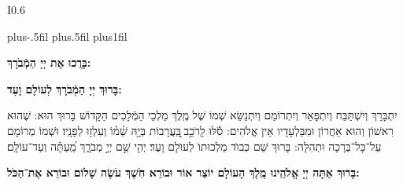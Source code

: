 \documentclass[twoside, openany, parskip=half, 11pt]{book}
\begin{document}
\newcommand{\barachu}{
\begin{wrapfigure}[5]{I}{0.6\textwidth}
\begin{minipage}{0.6\textwidth}
\leftskip=0pt plus-.5fil
\rightskip=0pt plus.5fil
\parfillskip=0pt plus1fil
\begin{large}

\shatz
\textbf{בָּרֲכוּ אֶת יְיָ הַמְֿבֹרָךְ:}
\end{large}

\vspace{12pt}

\shatzvkahal
\textbf{בָּרוּךְ יְיָ הַמְֿבֹרָךְ לְעוֹלָם וָעֶד:}
\end{minipage}
\end{wrapfigure}

\begin{footnotesize}
יִתְבָּרַךְ וְיִשְׁתַּבַּח וְיִתְפָּאַר וְיִתְרוֹמַם וְיִתְנַשֵּׂא שְׁמוֹ שֶׁל מֶֽלֶךְ מַלְכֵי הַמְּֿלָכִים הַקָּדוֹשׁ בָּרוּךְ הוּא: שֶׁהוּא רִאשׁוֹן וְהוּא אַחֲרוֹן וּמִבַּלְעָדָיו אֵין אֱלֹהִים: 
\source{תהלים סח} 
סֹ֡לּוּ לָֽרֹכֵ֣ב ֖בָּֽעֲרָבוֹת בְּיָ֥הּ שְׁ֜מ֗וֹ וְעִלְז֥וּ לְפָנָֽיו׃ וּשְׁמוֹ מְרוֹמָם עַל־כָּל־בְּרָכָה וּתְהִלָּה: בָּרוּךְ שֵׁם כְּבוֺד מַלְכוּתוֺ לְעוֺלָם וָעֶד׃ יְהִ֤י 
\source{תהלים קיג}
שֵׁ֣ם יְיָ֣ מְבֹרָ֑ךְ מֵֽ֝עַתָּ֗ה וְעַד־עוֹלָֽם׃

\end{footnotesize}
}


\barachu

\textbf{
בָּרוּךְ אַתָּה יְיָ אֱלֹהֵֽינוּ מֶֽלֶךְ הָעוֹלָם יוֹצֵר אוֹר וּבוֹרֵא חֹֽשֶׁךְ עֹשֶׂה שָׁלוֹם וּבוֹרֵא אֶת־הַכֹּל:
}

\newcommand{\hameir}{
\firstword{הַמֵּאִיר}
 לָאָֽרֶץ וְלַדָּרִים עָלֶֽיהָ בְּרַחֲמִים וּבְטוּבוֹ מְחַדֵּשׁ בְּכָל־יוֹם תָּמִיד מַעֲשֵׂה בְרֵאשִׁית:
\source{תהלים קד}
 מָֽה־רַבּ֬וּ מַֽעֲשֶׂ֨יךָ יְיָ֗ ֖כֻּלָּם בְּחָכְמָ֣ה עָשִׂ֑יתָ מָֽלְֿאָ֥ה הָ֝אָ֗רֶץ קִנְיָנֶֽךָ׃ הַמֶּֽלֶךְ הַמְֿרוֹמָם לְבַדּוֹ מֵאָז הַמְֿשֻׁבָּח וְהַמְֿפֹאָר וְהַמִּתְנַשֵּׂא מִימוֹת עוֹלָם: אֱלֹהֵי עוֹלָם בְּרַחֲמֶיךָ הָרַבִּים רַחֵם עָלֵינוּ אֲדוֹן עֻזֵּֽנוּ צוּר מִשְׂגַּבֵּנוּ מָגֵן יִשְׁעֵֽנוּ מִשְׂגָּב בַּעֲדֵֽנוּ: אֵ֗ל בָּ֗רוּךְ גְּ֗דוֹל דֵּ֗עָה הֵ֗כִין וּ֗פָעַל זָ֗הֳרֵי חַ֗מָּה ט֗וֹב יָ֗צַר כָּ֗בוֹד לִ֗שְׁמוֹ מְ֗אוֹרוֹת נָ֗תַן סְ֗בִיבוֹת עֻ֗זּוֹ פִּ֗נּוֹת צְ֗בָאָיו קְ֗דוֹשִׁים ר֗וֹמֲמֵי שַׁ֗דַּי תָּ֗מִיד מְסַפְּֿרִים כְּבוֹד־אֵל וּקְדֻשָׁתוֹ: תִּתְבָּרַךְ יְיָ אֱלֹהֵֽינוּ עַל־שֶׁבַח מַעֲשֵׂי יָדֶֽיךָ וְעַל־מְאֽוֹרֵי אוֹר שֶׁעָשִֽׂיתָ יְפָאֲרֽוּךָ סֶּֽלָה:
}
\end{document}
